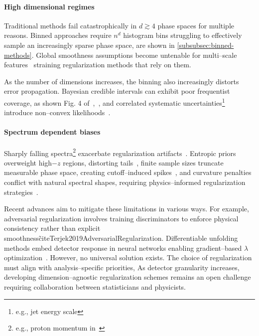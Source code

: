         \paragraph{High dimensional regimes}  
            Traditional methods fail catastrophically in \(d \gtrsim 4\) phase spaces for multiple reasons.
            Binned approaches require \(n^d\) histogram bins struggling to effectively sample an increasingly sparse phase space, are shown in \cref{subsubsec:binned-methods}.
            Global smoothness assumptions become untenable for multi--scale features~\cite{fernandez-martinez_curse_2020, xia_bayesian_2022, hocker_svd_1996} straining regularization methods that rely on them. 

            As the number of dimensions increases, the binning also increasingly distorts error propagation. 
            Bayesian credible intervals can exhibit poor frequentist coverage, as shown Fig. 4 of~\cite{Zhang2006AIntervals},~\cite{eberly_estimating_2003, szabo_frequentist_2015}, and correlated systematic uncertainties\footnote{e.g., jet energy scale} introduce non--convex likelihoods~\cite{berger_simplified_2023, Berger2017LectureATLAS}.

        \paragraph{Spectrum dependent biases}  
            Sharply falling spectra\footnote{e.g., proton momentum in~\cite{arnison_transverse_1982}} exacerbate regularization artifacts~\cite{gaponenko_practical_2020}.
            Entropic priors overweight high\(-z\) regions, distorting tails~\cite{caticha_entropic_2004, rodriguez_entropic_2002, Handley2019Maximum-EntropyDistribution, brewer_entropic_2009},
            finite sample sizes truncate measurable phase space, creating cutoff--induced spikes~\cite{finotello_functional_2025, marchand_bayesian_2012},
            and curvature penalties conflict with natural spectral shapes, requiring physics--informed regularization strategies~\cite{lee_explicit_2023, moosavi-dezfooli_robustness_2018, zech_analysis_2016, Baron2020ExtendingMethod}.  

        Recent advances aim to mitigate these limitations in various ways.
        For example, adversarial regularization involves training discriminators to enforce physical consistency rather than explicit smoothness\~cite{Terjek2019AdversarialRegularization}.
        Differentiable unfolding methods embed detector response in neural networks enabling gradient--based \(\lambda\) optimization~\cite{delaRosa2020DifferentiableAnalysis}.
        However, no universal solution exists.
        The choice of regularization must align with analysis--specific priorities,
        As detector granularity increases, developing dimension--agnostic regularization schemes remains an open challenge requiring collaboration between statisticians and physicists.
